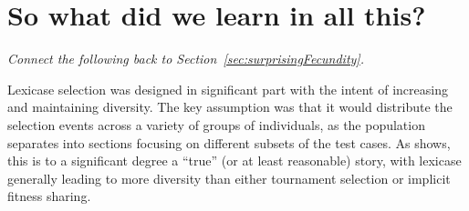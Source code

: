 
\section{So what did we learn in all this?}
\label{sec:whatDidWeLearn}

\emph{Connect the following back to Section~\ref{sec:surprisingFecundity}.}

Lexicase selection \citep{Helmuth:2015:ieeeTEC} was designed in significant part with the intent of 
increasing and maintaining diversity. The key assumption was that it would distribute the selection 
events across a variety of groups of individuals, as the population separates into sections focusing
on different subsets of the test cases. As \cite{helmuth:GPTP15} shows, this is to a significant
degree a ``true'' (or at least reasonable) story, with lexicase generally leading to more diversity
than either tournament selection or implicit fitness sharing.

